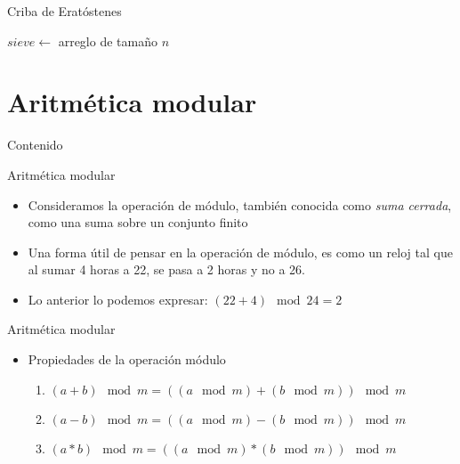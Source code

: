 \documentclass[]{beamer}
\begin{document}
\begin{frame}{Criba de Erat\'ostenes}
  \begin{algorithm}[H]
    \SetAlgoLined
    $sieve \leftarrow$ arreglo de tama\~no $n$\;
  \end{algorithm}
\end{frame}

\section{Aritm\'etica modular}
\begin{frame}{Contenido}
\tableofcontents[currentsection]
\end{frame}

\begin{frame}{Aritm\'etica modular}
  \begin{itemize}
    \item Consideramos la operaci\'on de m\'odulo, tambi\'en conocida como \textit{suma cerrada}, como una suma sobre un conjunto finito
      \pause
    \item Una forma \'util de pensar en la operaci\'on de m\'odulo, es como un reloj tal que al sumar 4 horas a 22, se pasa a 2 horas y no a 26.
      \pause
    \item Lo anterior lo podemos expresar: $(22+4) \mod 24 = 2$
  \end{itemize}
\end{frame}

\begin{frame}{Aritm\'etica modular}
  \begin{itemize}
    \item Propiedades de la operaci\'on m\'odulo
      \pause
      \begin{enumerate}
        \item $(a + b) \mod m = ((a \mod m) + (b \mod m))\mod m$
          \pause
        \item $(a - b) \mod m = ((a \mod m) - (b \mod m))\mod m$
          \pause
        \item $(a * b) \mod m = ((a \mod m) * (b \mod m))\mod m$
          \pause
      \end{enumerate}
  \end{itemize}
\end{frame}
\end{document}
